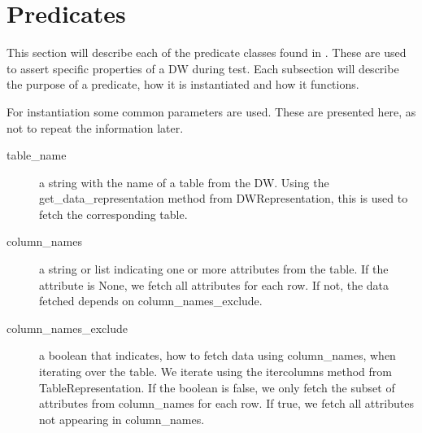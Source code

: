 \section{Predicates}
This section will describe each of the predicate classes found in \FW. These are used to assert specific properties of a DW during test. Each subsection will describe the purpose of a predicate, how it is instantiated and how it functions.

For instantiation some common parameters are used. These are presented here, as not to repeat the information later.
\begin{description}
\item [table\_name] a string with the name of a table from the DW. Using the get\_data\_representation method from DWRepresentation, this is used to fetch the corresponding table.
\item [column\_names] a string or list indicating one or more attributes from the table. If the attribute is None, we fetch all attributes for each row. If not, the data fetched depends on column\_names\_exclude.
\item [column\_names\_exclude] a boolean that indicates, how to fetch data using column\_names, when iterating over the table. We iterate using the itercolumns method from TableRepresentation. If the boolean is false, we only fetch the subset of attributes from column\_names for each row. If true, we fetch all attributes not appearing in column\_names.
\end{description}












